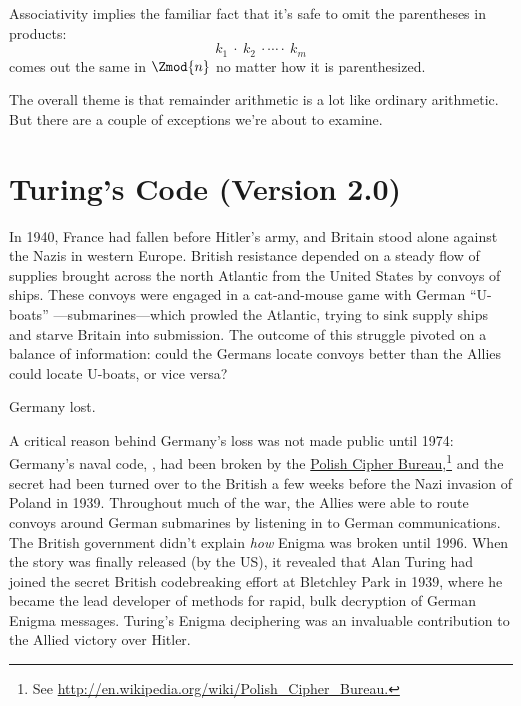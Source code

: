Associativity implies the familiar fact that it's safe to omit the
parentheses in products:
\[
k_1\ \cdot\ k_2\ \cdot \cdots \cdot\ k_m
\]
comes out the same in $\Zmod{n}$ no matter how it is parenthesized.

The overall theme is that remainder arithmetic is a lot like ordinary
arithmetic.  But there are a couple of exceptions we're about to
examine.

\begin{problems}
\practiceproblems
{}

\homeworkproblems
{}

\classproblems
{}

\examproblems

\end{problems}

\section{Turing's Code (Version 2.0)}

In 1940, France had fallen before Hitler's army, and Britain stood
alone against the Nazis in western Europe.  British resistance
depended on a steady flow of supplies brought across the north
Atlantic from the United States by convoys of ships.  These convoys
were engaged in a cat-and-mouse game with German ``U-boats''
---submarines---which prowled the Atlantic, trying to sink supply
ships and starve Britain into submission.  The outcome of this
struggle pivoted on a balance of information: could the Germans locate
convoys better than the Allies could locate U-boats, or vice versa?

Germany lost.

A critical reason behind Germany's loss was not made public until
1974: Germany's naval code, , had been broken by the
\href{http://en.wikipedia.org/wiki/Polish_Cipher_Bureau}{Polish Cipher
  Bureau},\footnote{See
  \href{http://en.wikipedia.org/wiki/Polish_Cipher_Bureau}
       {http://en.wikipedia.org/wiki/Polish\_Cipher\_Bureau.}}  and
the secret had been turned over to the British a few weeks before the
Nazi invasion of Poland in 1939.  Throughout much of the war, the
Allies were able to route convoys around German submarines by
listening in to German communications.  The British government didn't
explain \emph{how} Enigma was broken until 1996.  When the story was
finally released (by the US), it revealed that Alan Turing had joined
the secret British codebreaking effort at Bletchley Park in 1939,
where he became the lead developer of methods for rapid, bulk
decryption of German Enigma messages.  Turing's Enigma deciphering was
an invaluable contribution to the Allied victory over Hitler.

